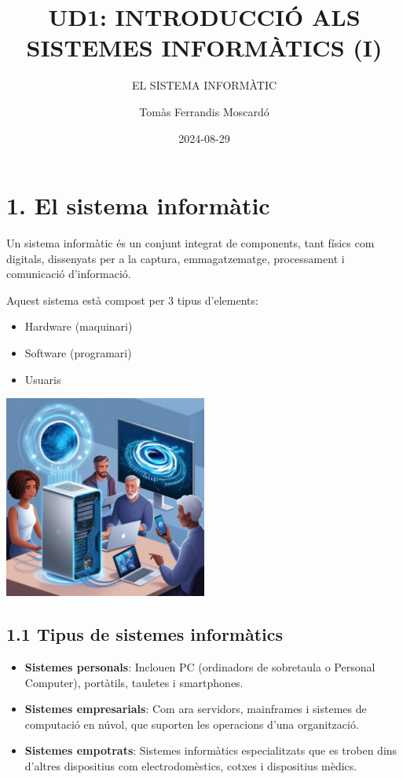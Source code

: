 \documentclass[
  12 pt,
  a4paper,
]{article}
\title{UD1: INTRODUCCIÓ ALS SISTEMES INFORMÀTICS (I)}
\subtitle{EL SISTEMA INFORMÀTIC}
\author{Tomàs Ferrandis Moscardó}
\date{2024-08-29}
\providecommand{\tightlist}{%
  \setlength{\itemsep}{0pt}\setlength{\parskip}{0pt}}
\begin{document}
\maketitle

{
\setcounter{tocdepth}{2}
\tableofcontents
}
\newpage
\renewcommand\tablename{Tabla}

\section{1. El sistema informàtic}\label{el-sistema-informuxe0tic}

Un sistema informàtic és un conjunt integrat de components, tant físics
com digitals, dissenyats per a la captura, emmagatzematge, processament
i comunicació d'informació.

Aquest sistema està compost per 3 tipus d'elements:

\begin{itemize}
\item
  Hardware (maquinari)
\item
  Software (programari)
\item
  Usuaris
\end{itemize}

\includegraphics[width=0.5\textwidth,height=\textheight]{recursos/treselementsFuturista.jpg}

\subsection{1.1 Tipus de sistemes
informàtics}\label{tipus-de-sistemes-informuxe0tics}

\begin{itemize}
\tightlist
\item
  \textbf{Sistemes personals}: Inclouen PC (ordinadors de sobretaula o
  Personal Computer), portàtils, tauletes i smartphones.
\item
  \textbf{Sistemes empresarials}: Com ara servidors, mainframes i
  sistemes de computació en núvol, que suporten les operacions d'una
  organització.
\item
  \textbf{Sistemes empotrats}: Sistemes informàtics especialitzats que
  es troben dins d'altres dispositius com electrodomèstics, cotxes i
  dispositius mèdics.
\end{itemize}
\end{document}
